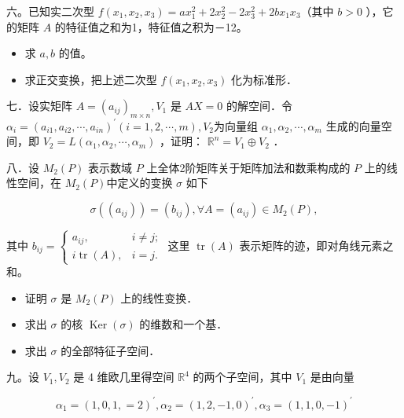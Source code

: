 \documentclass{article}
\begin{document}
六。已知实二次型 \(f\left(x_{1}, x_{2}, x_{3}\right)=a x_{1}^{2}+2 x_{2}^{2}-2 x_{3}^{2}+2 b x_{1} x_{3}\)（其中 \(b>0\) ），它的矩阵 \(A\) 的特征值之和为1，特征值之积为－12。

\begin{itemize}

  \item[1．] 求 \(a, b\) 的值。

  \item[2．] 求正交变换，把上述二次型 \(f\left(x_{1}, x_{2}, x_{3}\right)\) 化为标准形．
\end{itemize}

七．设实矩阵 \(A=\left(a_{i j}\right)_{m \times n}, V_{1}\) 是 \(A X=0\) 的解空间．令 \(\alpha_{i}=\left(a_{i 1}, a_{i 2}, \cdots, a_{i n}\right)^{\prime}(i=1,2, \cdots, m), V_{2}\)为向量组 \(\alpha_{1}, \alpha_{2}, \cdots, \alpha_{m}\) 生成的向量空间，即 \(V_{2}=L\left(\alpha_{1}, \alpha_{2}, \cdots, \alpha_{m}\right)\) ，证明： \(\mathbb{R}^{n}=V_{1} \oplus V_{2}\) ．

八．设 \(M_{2}(P)\) 表示数域 \(P\) 上全体2阶矩阵关于矩阵加法和数乘构成的 \(P\) 上的线性空间，在 \(M_{2}(P)\)中定义的变换 \(\sigma\) 如下

\[
\sigma\left(\left(a_{i j}\right)\right)=\left(b_{i j}\right), \forall A=\left(a_{i j}\right) \in M_{2}(P),
\]

其中 \(b_{i j}=\left\{\begin{array}{ll}a_{i j}, & i \neq j ; \\ i \operatorname{tr}(A), & i=j .\end{array}\right.\) 这里 \(\operatorname{tr}(A)\) 表示矩阵的迹，即对角线元素之和。

\begin{itemize}

  \item[1．] 证明 \(\sigma\) 是 \(M_{2}(P)\) 上的线性变换．

  \item[2．] 求出 \(\sigma\) 的核 \(\operatorname{Ker}(\sigma)\) 的维数和一个基．

  \item[3．] 求出 \(\sigma\) 的全部特征子空间．
\end{itemize}

九。设 \(V_{1}, V_{2}\) 是 4 维欧几里得空间 \(\mathbb{R}^{4}\) 的两个子空间，其中 \(V_{1}\) 是由向量

\[
\alpha_{1}=(1,0,1,=2)^{\prime}, \alpha_{2}=(1,2,-1,0)^{\prime}, \alpha_{3}=(1,1,0,-1)^{\prime}
\]
\end{document}
